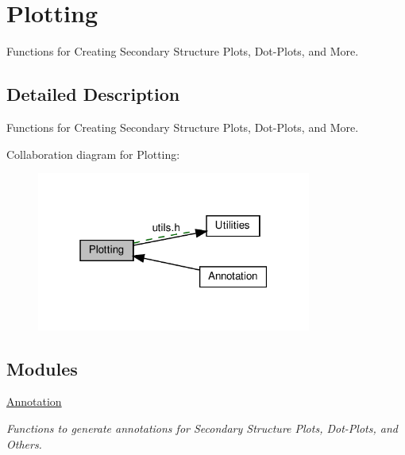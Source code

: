 \hypertarget{group__plotting__utils}{}\section{Plotting}
\label{group__plotting__utils}


Functions for Creating Secondary Structure Plots, Dot-\/\+Plots, and More.  




\subsection{Detailed Description}
Functions for Creating Secondary Structure Plots, Dot-\/\+Plots, and More. 

Collaboration diagram for Plotting\+:
\nopagebreak
\begin{figure}[H]
\begin{center}
\leavevmode
\includegraphics[width=256pt]{group__plotting__utils}
\end{center}
\end{figure}
\subsection*{Modules}
\begin{DoxyCompactItemize}
\item 
\hyperlink{group__annotation__utils}{Annotation}
\begin{DoxyCompactList}\small\item\em Functions to generate annotations for Secondary Structure Plots, Dot-\/\+Plots, and Others. \end{DoxyCompactList}\end{DoxyCompactItemize}
